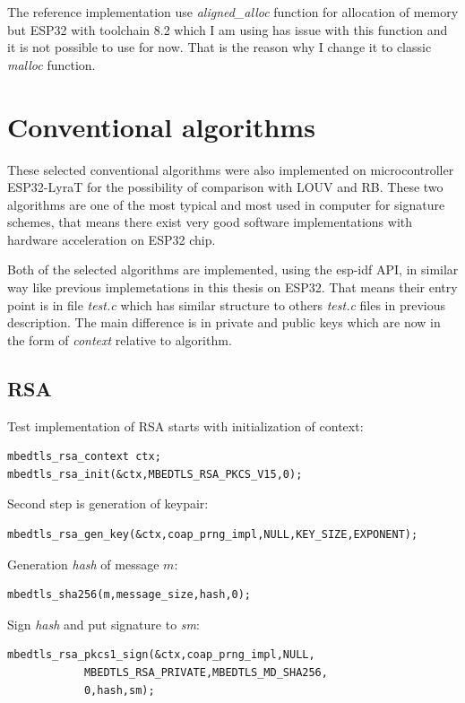 \documentclass[thesis=M,english]{FITthesis}[2019/12/23]
\begin{document}
\bigskip
\noindent
The reference implementation use \textit{aligned\_alloc} function for allocation of memory but ESP32 with toolchain 8.2 which I am using has issue with this function and it is not possible to use for now. That is the reason why I change it to classic \textit{malloc} function.

\newpage
\section{Conventional algorithms}
These selected conventional algorithms were also implemented on microcontroller ESP32-LyraT for the possibility of comparison with LOUV and RB. These two algorithms are one of the most typical and most used in computer for signature schemes, that means there exist very good software implementations with hardware acceleration on ESP32 chip. 

\bigskip
\noindent
Both of the selected algorithms are implemented, using the esp-idf API, in similar way like previous implemetations in this thesis on ESP32. That means their entry point is in file \textit{test.c} which has similar structure to others \textit{test.c} files in previous description. The main difference is in private and public keys which are now in the form of \textit{context} relative to algorithm.

\subsection{RSA}
Test implementation of RSA starts with initialization of context:
\begin{lstlisting}[frame=single]
mbedtls_rsa_context ctx;
mbedtls_rsa_init(&ctx,MBEDTLS_RSA_PKCS_V15,0);
\end{lstlisting}

\noindent
Second step is generation of keypair:
\begin{lstlisting}[frame=single]
mbedtls_rsa_gen_key(&ctx,coap_prng_impl,NULL,KEY_SIZE,EXPONENT);
\end{lstlisting}

\noindent
Generation \textit{hash} of message $m$:
\begin{lstlisting}[frame=single]
mbedtls_sha256(m,message_size,hash,0);
\end{lstlisting}

\noindent
Sign \textit{hash} and put signature to \textit{sm}:
\begin{lstlisting}[frame=single]
mbedtls_rsa_pkcs1_sign(&ctx,coap_prng_impl,NULL,
			MBEDTLS_RSA_PRIVATE,MBEDTLS_MD_SHA256,
			0,hash,sm);
\end{lstlisting}
\end{document}
